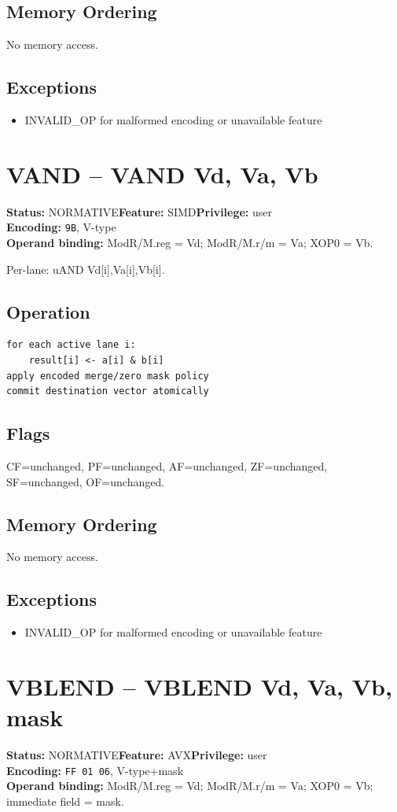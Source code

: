\documentclass[10pt]{article}
\begin{document}
\subsection*{Memory Ordering}
No memory access.
\subsection*{Exceptions}
\begin{itemize}
\item INVALID\_OP for malformed encoding or unavailable feature
\end{itemize}
\clearpage

\section{VAND -- VAND Vd, Va, Vb}
\textbf{Status:} NORMATIVE\quad \textbf{Feature:} SIMD\quad \textbf{Privilege:} user\\
\textbf{Encoding:} \texttt{9B}, V-type\\
\textbf{Operand binding:} ModR/M.reg = Vd; ModR/M.r/m = Va; XOP0 = Vb.

Per-lane: uAND Vd[i],Va[i],Vb[i].

\subsection*{Operation}
\begin{lstlisting}
for each active lane i:
    result[i] <- a[i] & b[i]
apply encoded merge/zero mask policy
commit destination vector atomically
\end{lstlisting}
\subsection*{Flags}
CF=unchanged, PF=unchanged, AF=unchanged, ZF=unchanged, SF=unchanged, OF=unchanged.
\subsection*{Memory Ordering}
No memory access.
\subsection*{Exceptions}
\begin{itemize}
\item INVALID\_OP for malformed encoding or unavailable feature
\end{itemize}
\clearpage

\section{VBLEND -- VBLEND Vd, Va, Vb, mask}
\textbf{Status:} NORMATIVE\quad \textbf{Feature:} AVX\quad \textbf{Privilege:} user\\
\textbf{Encoding:} \texttt{FF 01 06}, V-type+mask\\
\textbf{Operand binding:} ModR/M.reg = Vd; ModR/M.r/m = Va; XOP0 = Vb; immediate field = mask.
\end{document}
